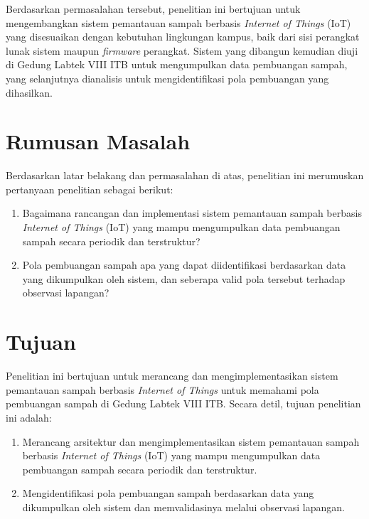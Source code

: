 Berdasarkan permasalahan tersebut, penelitian ini bertujuan untuk mengembangkan sistem pemantauan sampah berbasis \textit{Internet of Things} (IoT) yang disesuaikan dengan kebutuhan lingkungan kampus, baik dari sisi perangkat lunak sistem maupun \textit{firmware} perangkat. Sistem yang dibangun kemudian diuji di Gedung Labtek VIII ITB untuk mengumpulkan data pembuangan sampah, yang selanjutnya dianalisis untuk mengidentifikasi pola pembuangan yang dihasilkan.

\section{Rumusan Masalah}

Berdasarkan latar belakang dan permasalahan di atas, penelitian ini merumuskan pertanyaan penelitian sebagai berikut:

\begin{enumerate}
    \item Bagaimana rancangan dan implementasi sistem pemantauan sampah berbasis \textit{Internet of Things} (IoT) yang mampu mengumpulkan data pembuangan sampah secara periodik dan terstruktur?

    \item Pola pembuangan sampah apa yang dapat diidentifikasi berdasarkan data yang dikumpulkan oleh sistem, dan seberapa valid pola tersebut terhadap observasi lapangan?
\end{enumerate}

\section{Tujuan}

Penelitian ini bertujuan untuk merancang dan mengimplementasikan sistem pemantauan sampah berbasis \textit{Internet of Things} untuk memahami pola pembuangan sampah di Gedung Labtek VIII ITB. Secara detil, tujuan penelitian ini adalah:

\begin{enumerate}
    \item Merancang arsitektur dan mengimplementasikan sistem pemantauan sampah berbasis \textit{Internet of Things} (IoT) yang mampu mengumpulkan data pembuangan sampah secara periodik dan terstruktur.

    \item Mengidentifikasi pola pembuangan sampah berdasarkan data yang dikumpulkan oleh sistem dan memvalidasinya melalui observasi lapangan.
\end{enumerate}

